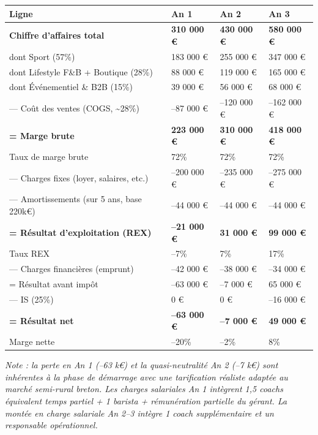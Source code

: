 \documentclass[11pt, a4paper]{article}
\newcommand{\redcell}[1]{\textcolor{fc-red}{\textbf{#1}}}
\begin{document}
\begin{center}
\begin{tabular}{@{}p{6.5cm}p{2.5cm}p{2.5cm}p{2.5cm}@{}}
\toprule
\rowcolor{fc-ink}\color{white}\textbf{Ligne} & \color{white}\textbf{An 1} & \color{white}\textbf{An 2} & \color{white}\textbf{An 3} \\
\midrule
\textbf{Chiffre d'affaires total} & \redcell{310 000 €} & \redcell{430 000 €} & \redcell{580 000 €} \\
\rowcolor{fc-bg2} dont Sport (57\%) & 183 000 € & 255 000 € & 347 000 € \\
dont Lifestyle F\&B + Boutique (28\%) & 88 000 € & 119 000 € & 165 000 € \\
\rowcolor{fc-bg2} dont Événementiel \& B2B (15\%) & 39 000 € & 56 000 € & 68 000 € \\
— Coût des ventes (COGS, \textasciitilde28\%) & –87 000 € & –120 000 € & –162 000 € \\
\midrule
\textbf{= Marge brute} & \textbf{223 000 €} & \textbf{310 000 €} & \textbf{418 000 €} \\
\rowcolor{fc-bg2} Taux de marge brute & 72\% & 72\% & 72\% \\
— Charges fixes (loyer, salaires, etc.) & –200 000 € & –235 000 € & –275 000 € \\
\rowcolor{fc-bg2} — Amortissements (sur 5 ans, base 220k€) & –44 000 € & –44 000 € & –44 000 € \\
\midrule
\textbf{= Résultat d'exploitation (REX)} & \textbf{–21 000 €} & \textbf{31 000 €} & \textbf{99 000 €} \\
\rowcolor{fc-bg2} Taux REX & –7\% & 7\% & 17\% \\
— Charges financières (emprunt) & –42 000 € & –38 000 € & –34 000 € \\
\rowcolor{fc-bg2} = Résultat avant impôt & –63 000 € & –7 000 € & 65 000 € \\
— IS (25\%) & 0 € & 0 € & –16 000 € \\
\midrule
\textbf{= Résultat net} & \textbf{–63 000 €} & \textbf{–7 000 €} & \textbf{49 000 €} \\
\rowcolor{fc-bg2} Marge nette & –20\% & –2\% & 8\% \\
\bottomrule
\end{tabular}
\end{center}

\vspace{8pt}
{\small\color{fc-ink3}\textit{Note : la perte en An 1 (–63 k€) et la quasi-neutralité An 2 (–7 k€) sont inhérentes à la phase de démarrage avec une tarification réaliste adaptée au marché semi-rural breton. Les charges salariales An 1 intègrent 1,5 coachs équivalent temps partiel + 1 barista + rémunération partielle du gérant. La montée en charge salariale An 2–3 intègre 1 coach supplémentaire et un responsable opérationnel.}}
\end{document}
